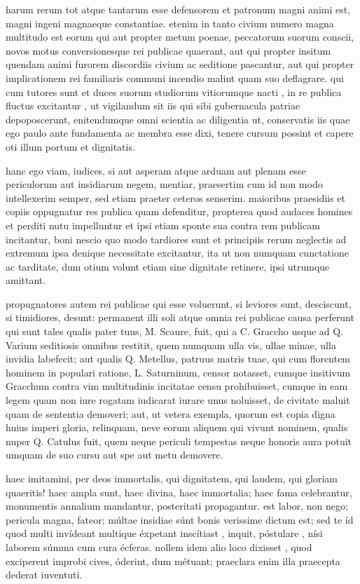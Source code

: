  harum rerum tot atque tantarum esse defensorem et patronum magni animi est, magni ingeni magnaeque constantiae. etenim in tanto civium numero magna multitudo est eorum qui aut propter metum poenae, peccatorum suorum conscii, novos motus conversionesque rei publicae quaerant, aut qui propter insitum quendam animi furorem discordiis civium ac seditione pascantur, aut qui propter implicationem rei familiaris communi incendio malint quam suo deflagrare. qui cum tutores sunt et duces suorum studiorum vitiorumque nacti , in re publica fluctus excitantur , ut vigilandum sit iis qui sibi gubernacula patriae depoposcerunt, enitendumque omni scientia ac diligentia ut, conservatis iis quae ego paulo ante fundamenta ac membra esse dixi, tenere cursum possint et capere oti illum portum et dignitatis.

 hanc ego viam, iudices, si aut asperam atque arduam aut plenam esse periculorum aut insidiarum negem, mentiar, praesertim cum id non modo intellexerim semper, sed etiam praeter ceteros senserim. maioribus praesidiis et copiis oppugnatur res publica quam defenditur, propterea quod audaces homines et perditi nutu impelluntur et ipsi etiam sponte sua contra rem publicam incitantur, boni nescio quo modo tardiores sunt et principiis rerum neglectis ad extremum ipsa denique necessitate excitantur, ita ut non numquam cunctatione ac tarditate, dum otium volunt etiam sine dignitate retinere, ipsi utrumque amittant.

 propugnatores autem rei publicae qui esse voluerunt, si leviores sunt, desciscunt, si timidiores, desunt: permanent illi soli atque omnia rei publicae causa perferunt qui sunt tales qualis pater tuus, M. Scaure, fuit, qui a C. Graccho usque ad Q. Varium seditiosis omnibus restitit, quem numquam ulla vis, ullae minae, ulla invidia labefecit; aut qualis Q. Metellus, patruus matris tuae, qui cum florentem hominem in populari ratione, L. Saturninum, censor notasset, cumque insitivum Gracchum contra vim multitudinis incitatae censu prohibuisset, cumque in eam legem quam non iure rogatam iudicarat iurare unus noluisset, de civitate maluit quam de sententia demoveri; aut, ut vetera exempla, quorum est copia digna huius imperi gloria, relinquam, neve eorum aliquem qui vivunt nominem, qualis nuper Q. Catulus fuit, quem neque periculi tempestas neque honoris aura potuit umquam de suo cursu aut spe aut metu demovere.

 haec imitamini, per deos immortalis, qui dignitatem, qui laudem, qui gloriam quaeritis! haec ampla sunt, haec divina, haec immortalia; haec fama celebrantur, monumentis annalium mandantur, posteritati propagantur. est labor, non nego; pericula magna, fateor; múltae insidiae súnt bonis verissime dictum est; sed te íd quod multi invídeant multique éxpetant inscítiast , inquit, póstulare , nísi laborem súmma cum cura écferas. nollem idem alio loco dixisset , quod exciperent improbi cives, óderint, dum métuant; praeclara enim illa praecepta dederat iuventuti.

